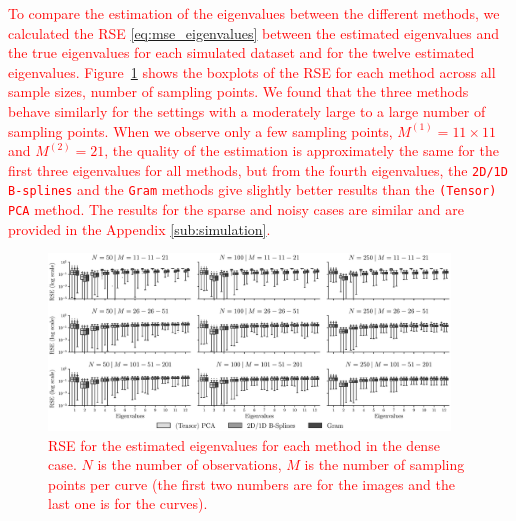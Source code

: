 \begin{results}
\textcolor{red}{To compare the estimation of the eigenvalues between the different methods, we calculated the RSE \eqref{eq:mse_eigenvalues} between the estimated eigenvalues and the true eigenvalues for each simulated dataset and for the twelve estimated eigenvalues.
Figure~\ref{fig:logAE_mfd_1d} shows the boxplots of the RSE for each method across all sample sizes, number of sampling points. We found that the three methods behave similarly for the settings with a moderately large to a large number of sampling points. When we observe only a few sampling points, $M^{(1)} = 11 \times 11$ and $M^{(2)} = 21$, the quality of the estimation is approximately the same for the first three eigenvalues for all methods, but from the fourth eigenvalues, the \texttt{2D/1D B-splines} and the \texttt{Gram} methods give slightly better results than the \texttt{(Tensor) PCA} method. The results for the sparse and noisy cases are similar and are provided in the Appendix \ref{sub:simulation}.}

\begin{figure}
    \centering
    \includegraphics[width=0.95\textwidth]{figures/AE.eps}
    \caption{\textcolor{red}{RSE for the estimated eigenvalues for each method in the dense case. $N$ is the number of observations, $M$ is the number of sampling points per curve (the first two numbers are for the images and the last one is for the curves).}}
    \label{fig:logAE_mfd_1d}
\end{figure}
\end{results}

